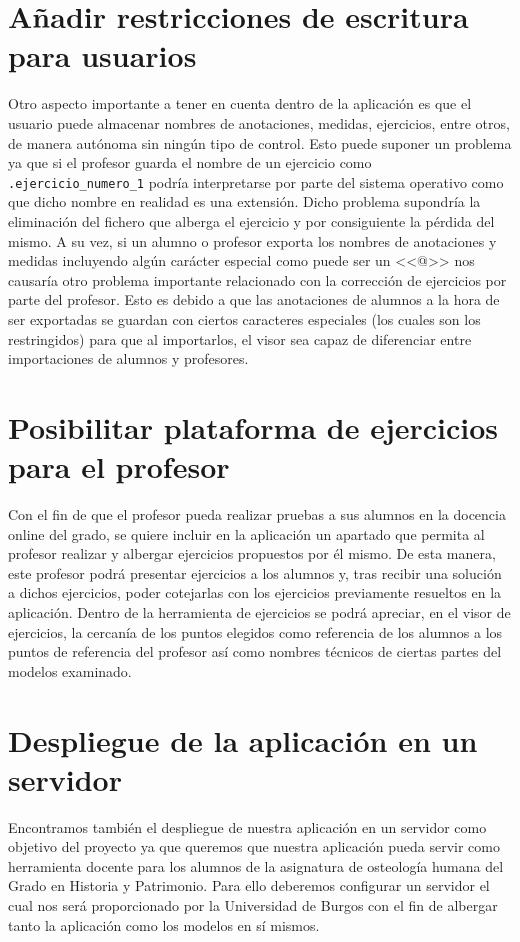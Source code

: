 \section{Añadir restricciones de escritura para usuarios}
Otro aspecto importante a tener en cuenta dentro de la aplicación es que el usuario puede almacenar nombres de anotaciones, medidas, ejercicios, entre otros, de manera autónoma sin ningún tipo de control. Esto puede suponer un problema ya que si el profesor guarda el nombre de un ejercicio como \texttt{.ejercicio\_numero\_1} podría interpretarse por parte del sistema operativo como que dicho nombre en realidad es una extensión. Dicho problema supondría la eliminación del fichero que alberga el ejercicio y por consiguiente la pérdida del mismo. A su vez, si un alumno o profesor exporta los nombres de anotaciones y medidas incluyendo algún carácter especial como puede ser un <<@>> nos causaría otro problema importante relacionado con la corrección de ejercicios por parte del profesor. Esto es debido a que las anotaciones  de alumnos a la hora de ser exportadas se guardan con ciertos caracteres especiales (los cuales son los restringidos) para que al importarlos, el visor sea capaz de diferenciar entre importaciones de alumnos y profesores.

\section{Posibilitar plataforma de ejercicios para el profesor}
Con el fin de que el profesor pueda realizar pruebas a sus alumnos en la docencia online del grado, se quiere incluir en la aplicación un apartado que permita al profesor realizar y albergar ejercicios propuestos por él mismo. De esta manera, este profesor podrá presentar ejercicios a los alumnos y, tras recibir una solución a dichos ejercicios, poder cotejarlas con los ejercicios previamente resueltos en la aplicación. Dentro de la herramienta de ejercicios se podrá apreciar, en el visor de ejercicios, la cercanía de los puntos elegidos como referencia de los alumnos a los puntos de referencia del profesor así como nombres técnicos de ciertas partes del modelos examinado.

\section{Despliegue de la aplicación en un servidor}
Encontramos también el despliegue de nuestra aplicación en un servidor como objetivo del proyecto ya que queremos que nuestra aplicación pueda servir como herramienta docente para los alumnos de la asignatura de osteología humana del Grado en Historia y Patrimonio. Para ello deberemos configurar un servidor el cual nos será proporcionado por la Universidad de Burgos con el fin de albergar tanto la aplicación como los modelos en sí mismos.

